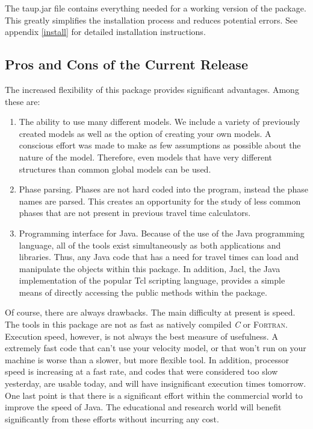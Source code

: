 The taup.jar file contains everything needed for a working version of the package.
This greatly simplifies the installation process and reduces potential errors.
See appendix \ref{install} for detailed installation instructions.

\subsection{Pros and Cons of the Current Release}
The increased flexibility of this package provides significant advantages. Among
these are:
\begin{enumerate}
\item The ability to use many different models. We include a variety of previously created
models as well as the option of creating your own models. A conscious effort 
was made to make as few assumptions as possible about the nature of the model. 
Therefore,
even models that have very different structures than common global models can be
used.

\item Phase parsing. Phases are not hard coded into the program, instead the phase
names are parsed. This creates an opportunity for the study of less common
phases that are not present in previous travel time calculators. 

\item Programming interface for Java. Because of the use of the Java programming
language, all of the tools exist simultaneously as both applications and libraries.
Thus, any Java code that has a need for travel times can load and manipulate
the objects within this package. In addition, Jacl, the Java implementation of the popular Tcl scripting language, provides a simple means of directly accessing the public methods within the package.

\end{enumerate}

Of course, there are always drawbacks. The main difficulty at present is speed. 
The tools in this package are not as fast as natively compiled \textit{C} or
\textsc{Fortran}. Execution speed, however, is not always the best measure 
of usefulness. A extremely fast code that can't use your velocity model, or that
won't run on your machine is worse than a slower, but more flexible tool. In
addition, processor speed is increasing at a fast rate, and codes 
that were considered
too slow yesterday, are usable today, and will have insignificant execution times
tomorrow. One last point is that there is a significant effort within the 
commercial world to improve the speed of Java. 
The educational and research
world will benefit significantly from these efforts without incurring any cost.

